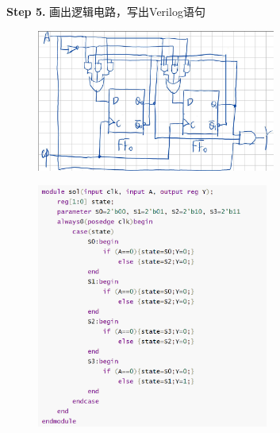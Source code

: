 \documentclass[a4paper,11pt,UTF8]{article}
\begin{document}
\textbf{Step 5.} 画出逻辑电路，写出Verilog语句
\begin{figure}[H]
	\centering
	\includegraphics[width=0.7\textwidth]{6.3.6_3}
\end{figure}
\begin{figure}[H]
	\centering
	\includegraphics[width=0.68\textwidth]{6.3.6_4}
\end{figure}
\end{document}
